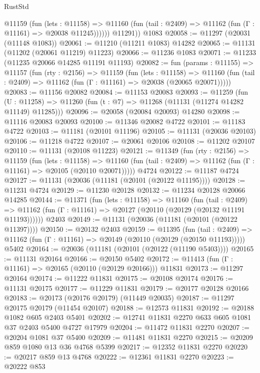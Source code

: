 \begin{lexlean}{RustStd}
\begin{coremodule}
            @11159
              (fun (lets : @11158) =>
              @11160 (fun (tail : @2409) => @11162 (fun (Γ : @11161) => @20038 @11245))))))
        @11291))
    @1083
@20058 := @11297 (@20031 (@11148 @1083))
@20061 := @11210 (@11211 @1083) @14282
@20065 := @11131 (@11202 (@20061 @11219) @11223)
@20066 := @11236 @1083
@20071 := @11233 (@11235 @20066 @14285 @11191 @11193)
@20082 := fun (params : @11155) =>
  @11157
    (fun (rty : @2156) =>
    @11159
      (fun (lets : @11158) =>
      @11160 (fun (tail : @2409) => @11162 (fun (Γ : @11161) => @20038 (@20065 @20071)))))
@20083 := @11156 @20082
@20084 := @11153 @20083
@20093 := @11259
    (fun (U : @11258) => @11260 (fun (t : @7) => @11268 (@11131 (@11274 @14282 @11149) @11285)))
@20096 := @20058 (@20084 @20093) @14280
@20098 := @11116 @20083 @20093
@20100 := @11346 @20082 @4722
@20101 := @11183 @4722
@20103 := @11181 (@20101 @11196)
@20105 := @11131 (@20036 @20103)
@20106 := @11218 @4722
@20107 := @20061 @20106
@20108 := @11202 @20107
@20110 := @11131 (@20108 @11223)
@20121 := @11349
    (fun (rty : @2156) =>
    @11159
      (fun (lets : @11158) =>
      @11160 (fun (tail : @2409) => @11162 (fun (Γ : @11161) => @20105 (@20110 @20071)))))
    @4724
@20122 := @11187 @4724
@20127 := @11131 (@20036 (@11181 (@20101 (@20122 @11195))))
@20128 := @11231 @4724
@20129 := @11230 @20128
@20132 := @11234 @20128 @20066 @14285
@20144 := @11371
    (fun (lets : @11158) =>
    @11160
      (fun (tail : @2409) =>
      @11162 (fun (Γ : @11161) => @20127 (@20110 (@20129 (@20132 @11191 @11193))))))
    @2403
@20149 := @11131 (@20036 (@11181 (@20101 (@20122 @11397))))
@20150 := @20132 @2403
@20159 := @11395
    (fun (tail : @2409) => @11162 (fun (Γ : @11161) => @20149 (@20110 (@20129 (@20150 @11193)))))
    @5402
@20164 := @20036 (@11181 (@20101 (@20122 (@11190 @5403))))
@20165 := @11131 @20164
@20166 := @20150 @5402
@20172 := @11413 (fun (Γ : @11161) => @20165 (@20110 (@20129 @20166))) @11831
@20173 := @11297 @20164
@20174 := @11222 @11831
@20175 := @20108 @20174
@20176 := @11131 @20175
@20177 := @11229 @11831
@20179 := @20177 @20128 @20166
@20183 := @20173 (@20176 @20179) (@11449 @20035)
@20187 := @11297 @20175 @20179 (@11454 @20107)
@20188 := @12573 @11831
@20192 := @20188 @1082 @605 @2403 @5401
@20202 := @12741 @11831 @2270 @633 @605 @1081 @37 @2403 @5400 @4727 @17979
@20204 := @11472 @11831 @2270
@20207 := @20204 @1081 @37 @5400
@20209 := @11481 @11831 @2270
@20215 := @20209 @859 @1080 @13 @36 @4768 @5399
@20217 := @12352 @11831 @2270
@20220 := @20217 @859 @13 @4768
@20222 := @12361 @11831 @2270
@20223 := @20222 @853

\end{coremodule}
\end{lexlean}
